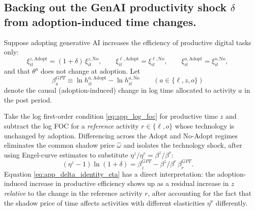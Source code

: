 \documentclass[12pt]{article}
\begin{document}
\subsection{Backing out the GenAI productivity shock $\delta$ from adoption-induced time changes.} \label{app:delta_inversion} 

Suppose adopting generative AI increases the efficiency of productive digital tasks only:
\begin{equation}
\label{eq:app_gpt_shock}
\xi_{it}^{z,\text{Adopt}}=(1+\delta)\,\xi_{it}^{z,\text{No}},
\qquad
\xi_{it}^{\ell,\text{Adopt}}=\xi_{it}^{\ell,\text{No}},
\qquad
\xi_{it}^{o,\text{Adopt}}=\xi_{it}^{o,\text{No}},
\end{equation}
and that $\theta^{a}$ does not change at adoption. Let
\begin{equation}
\beta^{GPT}_{a}\equiv
\ln h_{it}^{a,\text{Adopt}}-\ln h_{it}^{a,\text{No}}
\qquad (a\in\{\ell,z,o\})
\end{equation}
denote the causal (adoption-induced) change in log time allocated to activity $a$ in the post period.

Take the log first-order condition \eqref{eq:app_log_foc} for productive time $z$ and subtract the log FOC for a \emph{reference} activity $r\in\{\ell,o\}$ whose technology is unchanged by adoption. Differencing across the Adopt and No-Adopt regimes eliminates the common shadow price $\hat{\omega}$ and isolates the technology shock, after using Engel-curve estimates to substitute $\eta^{z}/\eta^{r}=\beta^{z}/\beta^{r}$:
\begin{equation}
\label{eq:app_delta_identity_eta}
(\eta^{z}-1)\ln(1+\delta)
=
\beta^{GPT}_{z}
-\beta^{z}/\beta^{r}\,\beta^{GPT}_{r}.
\end{equation}
Equation \eqref{eq:app_delta_identity_eta} has a direct interpretation: the adoption-induced increase in productive efficiency shows up as a residual increase in $z$ \emph{relative} to the change in the reference activity $r$, after accounting for the fact that the shadow price of time affects activities with different elasticities $\eta^{a}$ differently.




\end{document}
